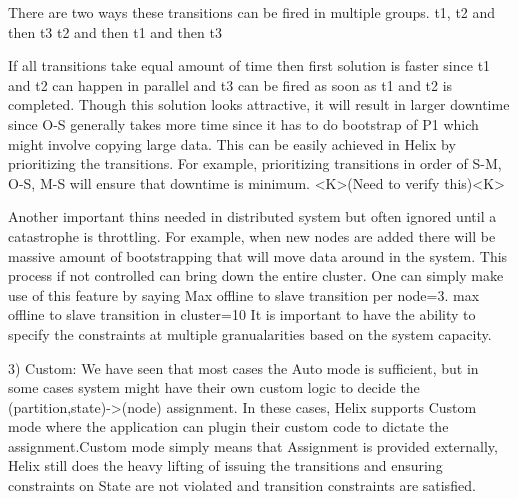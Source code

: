 {There are two ways these transitions can be fired in multiple groups. 
t1, t2 and then t3
t2 and then t1 and then t3

If all transitions take equal amount of time then first solution is faster since
t1 and t2 can happen in parallel and t3 can be fired as soon as t1 and t2 is
completed. Though this solution looks attractive, it will result in larger
downtime since O-S generally takes more time since it has to do bootstrap of P1
which might involve copying large data. This can be easily achieved in Helix by
prioritizing the transitions. For example, prioritizing transitions in order of
S-M, O-S, M-S will ensure that downtime is minimum. <K>(Need to verify this)<K>

Another important thins needed in distributed system but often ignored until a
catastrophe is throttling. For example, when new nodes are added there will be
massive amount of bootstrapping that will move data around in the system. This
process if not controlled can bring down the entire cluster.
One can simply make use of this feature by saying
Max offline to slave transition per node=3.
max offline to slave transition in cluster=10
It is important to have the ability to specify the constraints at multiple
granualarities based on the system capacity.

 
 
3) Custom: We have seen that most cases the Auto mode is sufficient, but
in some cases system might have their own custom logic to decide the
(partition,state)->(node) assignment. In these cases, Helix supports Custom mode
where the application can plugin their custom code to dictate the
assignment.Custom mode simply means that Assignment is provided externally,
Helix still does the heavy lifting of issuing the transitions and ensuring
constraints on State are not violated and transition constraints are satisfied.
}%


